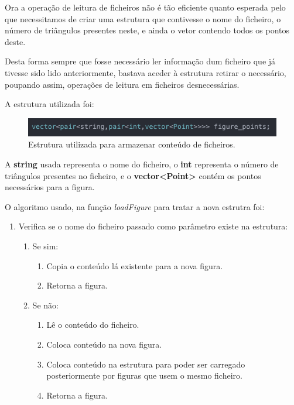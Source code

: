 \documentclass[a4paper]{article}
\begin{document}
Ora a operação de leitura de ficheiros não é tão eficiente quanto esperada pelo que necessitamos de criar uma estrutura que contivesse o nome do ficheiro, o número de triângulos presentes neste, e ainda o vetor contendo todos os pontos deste.

Desta forma sempre que fosse necessário ler informação dum ficheiro que já tivesse sido lido anteriormente, bastava aceder à estrutura retirar o necessário, poupando assim, operações de leitura em ficheiros desnecessárias.

A estrutura utilizada foi:

\begin{figure}[H]
\centering
\includegraphics[scale=0.6]{optimized_struct.png}
\caption{Estrutura utilizada para armazenar conteúdo de ficheiros.}
\label{img:optimized_struct}
\end{figure}

A \textbf{string} usada representa o nome do ficheiro, o \textbf{int} representa o número de triângulos presentes no ficheiro, e o \textbf{vector<Point>} contém os pontos necessários para a figura.

O algoritmo usado, na função \textit{loadFigure} para tratar a nova estrutra foi:

\ttfamily
\begin{enumerate}
  \item Verifica se o nome do ficheiro passado como parâmetro existe na estrutura:
  \begin{enumerate}
  	\item Se sim:
	\begin{enumerate}
		\item Copia o conteúdo lá existente para a nova figura.
		\item Retorna a figura.
	\end{enumerate}
	\item Se não:
	\begin{enumerate}
		\item Lê o conteúdo do ficheiro.
		\item Coloca conteúdo na nova figura.
		\item Coloca conteúdo na estrutura para poder ser carregado posteriormente por figuras que usem o mesmo ficheiro.
		\item Retorna a figura.
	 \end{enumerate}
  \end{enumerate}

\end{enumerate}
\rmfamily
\end{document}
